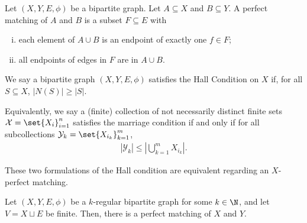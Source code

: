 \begin{definition}
  Let $\left(X,Y,E,\phi\right)$ be a bipartite graph. Let $A\subseteq X$ and $B\subseteq Y$. A {perfect matching} of $A$ and $B$ is a subset $F\subseteq E$ with
  \begin{enumerate}[(i)]
    \item each element of $A\cup B$ is an endpoint of exactly one $f\in F$;
    \item all endpoints of edges in $F$ are in $A\cup B$.
  \end{enumerate}
\end{definition}
\begin{definition}
  We say a bipartite graph $\left(X,Y,E,\phi\right)$ satisfies the {Hall Condition} on $X$ if, for all $S\subseteq X$, $\left\vert N(S) \right\vert \geq \left\vert S \right\vert$.\newline

  Equivalently, we say a (finite) collection of not necessarily distinct finite sets $\mathcal{X} = \set{X_i}_{i=1}^{n}$ satisfies the marriage condition if and only if for all subcollections $\mathcal{Y}_k = \set{X_{i_k}}_{k=1}^{m}$,
  \begin{align*}
    \left\vert \mathcal{Y}_k \right\vert \leq \left\vert \bigcup_{k=1}^{m}X_{i_k} \right\vert.
  \end{align*}
\end{definition}
\begin{remark}
These two formulations of the Hall condition are equivalent regarding an $X$-perfect matching.
\end{remark}
\begin{theorem}
  Let $\left(X,Y,E,\phi\right)$ be a $k$-regular bipartite graph for some $k\in \N$, and let $V = X\sqcup E$ be finite. Then, there is a perfect matching of $X$ and $Y$.\label{thm:hall_finite}
\end{theorem}
